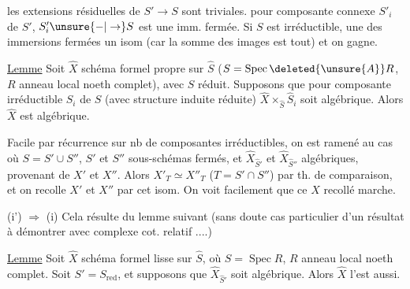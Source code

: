 
les extensions résiduelles de $S'\to S$ sont triviales.   pour  composante connexe $S'_i$ de $S'$, $S'_i\unsure{-|\to}S$ est une imm.  fermée. Si $S$ est irréductible, une des immersions fermées  un isom (car la somme des images est tout) et on gagne.  

\uline{Lemme} Soit $\widehat X$ schéma formel propre sur $\widehat S$ ($S=\operatorname{Spec}\deleted{\unsure{A}}R$, $R$ anneau local noeth complet), avec $S$ réduit. Supposons que pour  composante irréductible $S_i$ de $S$ (avec structure induite réduite) $\widehat X\times_{\widehat S}\widehat S_i$ soit algébrique. Alors $\widehat X$ est algébrique.

Facile par récurrence sur nb de composantes irréductibles, on est ramené au cas où $S=S'\cup S''$, $S'$ et $S''$ sous-schémas fermés, et $\widehat X_{\widehat S'}$ et $\widehat X_{\widehat S''}$  algébriques, provenant de $X'$ et $X''$. Alors $X'_T\simeq X''_T$ ($T=S'\cap S''$) par th. de comparaison, et on recolle $X'$ et $X''$ par cet isom. On voit facilement que ce $X$ recollé marche.

(i') $\Longrightarrow$ (i) \quad Cela résulte du lemme suivant (sans doute cas particulier d'un  résultat à démontrer avec complexe cot. relatif ....)

\uline{Lemme} Soit $\widehat X$ schéma formel  lisse sur $\widehat S$, où $S=\operatorname{Spec} R$, $R$ anneau local noeth complet. Soit $S'=S_{\text{red}}$, et supposons que $\widehat X_{\widehat S'}$ soit algébrique. Alors $\widehat X$ l'est aussi.
